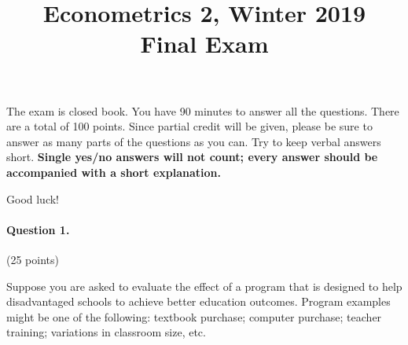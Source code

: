 \documentclass[a4paper, 12pt]{article}
\title{Econometrics 2, Winter 2019\\
Final Exam}
\date{}
\author{}
\begin{document}
\maketitle
\reversemarginpar

The exam is closed book. You have 90 minutes to answer all the questions. There are a total of 100 points. Since partial credit will be given, please be sure to answer as many parts of the questions as you can. Try to keep verbal answers short. \textbf{Single yes/no answers will not count; every answer should be accompanied with a short explanation.}

Good luck!
 


\paragraph{Question 1.} (25 points)

Suppose you are asked to evaluate the effect of a program that is designed to help disadvantaged schools to achieve better education outcomes. Program examples might be one of the following: textbook purchase; computer purchase; teacher training; variations in classroom size, etc. 
\end{document}
